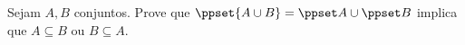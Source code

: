 \begin{exercise}
Sejam $A,B$ conjuntos. Prove que $\ppset {A\cup B} = \ppset A \cup \ppset B$ implica que $A \subseteq B$ ou $B\subseteq A$.
\end{exercise}